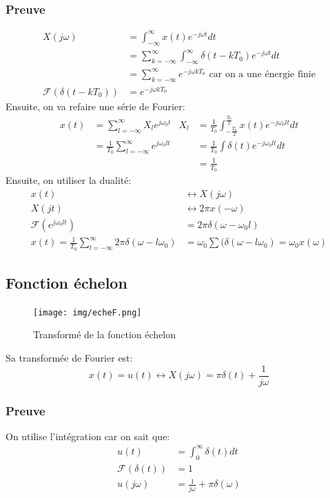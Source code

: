 \documentclass{report}
\begin{document}
\subsubsection{Preuve}
\begin{align*}
X(j\omega) &= \int_{-\infty}^{\infty} x(t) e^{-j \omega t} dt\\
&= \sum_{k = -\infty}^{\infty} \int_{-\infty}^{\infty} \delta(t- kT_0) e^{-j \omega t} dt\\
&= \sum_{k = -\infty}^{\infty} e^{-j \omega k T_0} \text{ car on a une énergie finie}\\
\mathcal{F}(\delta(t-kT_0)) &= e^{-j\omega k T_0}
\end{align*}
Ensuite, on va refaire une série de Fourier:
\begin{align*}
x(t) &= \sum_{l = -\infty}^{\infty} X_l e^{j\omega_0 t} & X_l &=  \frac{1}{T_0} \int_{-\frac{T_0}{2}}^{\frac{T_0}{2}} x(t) e^{-j \omega_0 lt} dt\\
&= \frac{1}{T_0} \sum_{l = -\infty}^{\infty} e^{j\omega_0 lt} & &= \frac{1}{T_0} \int \delta(t) e^{-j \omega_0 lt} dt\\
& & &= \frac{1}{T_0}
\end{align*} %
Ensuite, on utiliser la dualité:
\begin{align*}
x(t) &\longleftrightarrow X(j\omega)\\
X(jt) &\longleftrightarrow 2\pi x(-\omega)\\
\mathcal{F}(e^{j\omega_0 lt}) &= 2 \pi \delta(\omega - \omega_0 l)\\
x(t) = \frac{1}{T_0} \sum_{l = - \infty}^{\infty} 2 \pi \delta(\omega - l \omega_0) &= \omega_0 \sum (\delta(\omega -l \omega_0) = \omega_0 x(\omega)
\end{align*}

\subsection{Fonction échelon}
\begin{figure}[H]
\centering
\texttt{[image: img/echeF.png]}
\caption{Transformé de la fonction échelon}
\end{figure}
Sa transformée de Fourier est:
\begin{equation}
x(t) = u(t) \longleftrightarrow X(j\omega) = \pi \delta(t) + \frac{1}{j \omega}
\end{equation}

\subsubsection{Preuve}
On utilise l'intégration car on sait que:
\begin{align*}
u(t) &=  \int_0^{\infty} \delta(t) dt\\
\mathcal{F}(\delta(t)) &= 1\\
u(j\omega) &= \frac{1}{j \omega} + \pi \delta(\omega)
\end{align*}
\end{document}
